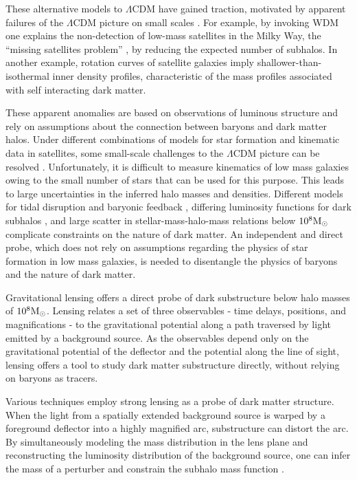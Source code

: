 These alternative models to $\Lambda$CDM have gained traction, motivated by apparent failures of the $\Lambda$CDM picture on small scales \citep{BullockBK17}. For example, by invoking WDM one explains the non-detection of low-mass satellites in the Milky Way, the ``missing satellites problem'' \citep{Klypin++99}, by reducing the expected number of subhalos. In another example, rotation curves of satellite galaxies imply shallower-than-isothermal inner density profiles, characteristic of the mass profiles associated with self interacting dark matter. 

These apparent anomalies are based on observations of luminous structure and rely on assumptions about the connection between baryons and dark matter halos. Under different combinations of models for star formation and kinematic data in satellites, some small-scale challenges to the $\Lambda$CDM picture can be resolved \citep{Kim++17}. Unfortunately, it is difficult to measure kinematics of low mass galaxies owing to the small number of stars that can be used for this purpose. This leads to large uncertainties in the inferred halo masses and densities. Different models for tidal disruption and baryonic feedback \citep{DespVeg16,GK++17}, differing luminosity functions for dark subhalos \citep{Nierenberg++16}, and large scatter in stellar-mass-halo-mass relations below $10^8 {\rm{M}_{\odot}}$ \citep{Munshi++17} complicate constraints on the nature of dark matter. An independent and direct probe, which does not rely on assumptions regarding the physics of star formation in low mass galaxies, is needed to disentangle the physics of baryons and the nature of dark matter. 

Gravitational lensing offers a direct probe of dark substructure below halo masses of $10^8 {\rm{M}_{\odot}}$. Lensing relates a set of three observables - time delays, positions, and magnifications - to the gravitational potential along a path traversed by light emitted by a background source. As the observables depend only on the gravitational potential of the deflector and the potential along the line of sight, lensing offers a tool to study dark matter substructure directly, without relying on baryons as tracers.

Various techniques employ strong lensing as a probe of dark matter structure. When the light from a spatially extended background source is warped by a foreground deflector into a highly magnified arc, substructure can distort the arc. By simultaneously modeling the mass distribution in the lens plane and reconstructing the luminosity distribution of the background source, one can infer the mass of a perturber and constrain the subhalo mass function \citep{Koopmans++05,Vegetti++09,Vegetti++12,Veg++14,Li++16,Hezaveh++16,Birrer++17a,Vegetti++18}.

